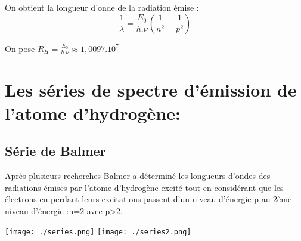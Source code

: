 \documentclass[12pt]{article}
\begin{document}
On obtient la longueur d'onde de la radiation émise :
$$\frac{1}{\lambda} = \frac{E_0}{h.\nu}(\frac{1}{n^2} - \frac{1}{p^2})$$

On pose $R_H = \frac{E_0}{h.\nu} \approx 1,0097.10^7$

\section{Les séries de spectre d'émission de l'atome d'hydrogène:}
\subsection{Série de Balmer}

Après plusieurs recherches Balmer a déterminé les longueurs d'ondes des radiations émises par l'atome d'hydrogène excité
tout en considérant que les électrons en perdant leurs excitations passent d'un niveau d'énergie  p  au 2ème niveau d'énergie :n=2
avec p>2.
\begin{center}

	\texttt{[image: ./series.png]}
	\texttt{[image: ./series2.png]}

\end{center}
\end{document}
